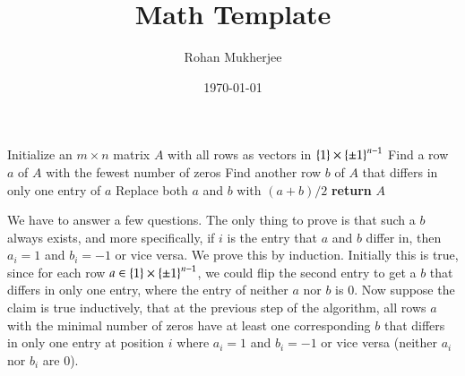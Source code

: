 \documentclass[12pt]{article}
\title{Math Template}
\date{\today}
\author{Rohan Mukherjee}
\theoremstyle{definitionstyle}
\newcommand{\SET}[1]{\Set{\mskip-\medmuskip #1 \mskip-\medmuskip}}
\begin{document}
    \maketitle
    
    \begin{algorithmic}
            \State Initialize an $m \times n$ matrix $A$ with all rows as vectors in $\SET{1} \times \SET{\pm 1}^{n-1}$
                \State Find a row $a$ of $A$ with the fewest number of zeros
                \State Find another row $b$ of $A$ that differs in only one entry of $a$
                \State Replace both $a$ and $b$ with $(a+b)/2$
            \EndWhile
            \State \textbf{return} $A$
        \EndProcedure
    \end{algorithmic}
    We have to answer a few questions. The only thing to prove is that such a $b$ always exists, and more specifically, if $i$ is the entry that $a$ and $b$ differ in, then $a_i = 1$ and $b_i = -1$ or vice versa. We prove this by induction. Initially this is true, since for each row $a \in \SET{1} \times \SET{\pm 1}^{n-1}$, we could flip the second entry to get a $b$ that differs in only one entry, where the entry of neither $a$ nor $b$ is 0. Now suppose the claim is true inductively, that at the previous step of the algorithm, all rows $a$ with the minimal number of zeros have at least one corresponding $b$ that differs in only one entry at position $i$ where $a_i = 1$ and $b_i = -1$ or vice versa (neither $a_i$ nor $b_i$ are 0). 
    
    
\end{document}
